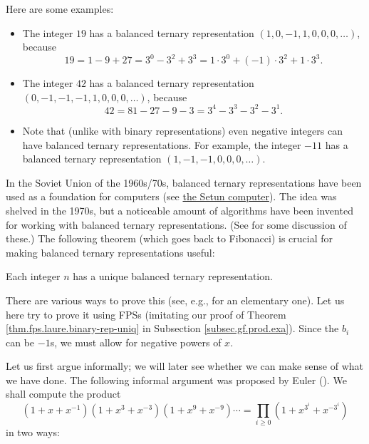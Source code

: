 Here are some examples:

\begin{itemize}
\item The integer $19$ has a balanced ternary representation $\left(
1,0,-1,1,0,0,0,\ldots\right)  $, because%
\[
19=1-9+27=3^{0}-3^{2}+3^{3}=1\cdot3^{0}+\left(  -1\right)  \cdot3^{2}%
+1\cdot3^{3}.
\]


\item The integer $42$ has a balanced ternary representation $\left(
0,-1,-1,-1,1,0,0,0,\ldots\right)  $, because%
\[
42=81-27-9-3=3^{4}-3^{3}-3^{2}-3^{1}.
\]


\item Note that (unlike with binary representations) even negative integers
can have balanced ternary representations. For example, the integer $-11$ has
a balanced ternary representation $\left(  1,-1,-1,0,0,0,\ldots\right)  $.
\end{itemize}

In the Soviet Union of the 1960s/70s, balanced ternary representations have
been used as a foundation for computers (see
\href{https://en.wikipedia.org/wiki/Setun}{the Setun computer}). The idea was
shelved in the 1970s, but a noticeable amount of algorithms have been invented
for working with balanced ternary representations. (See \cite[\S 4.1]%
{Knuth-TAoCP2} for some discussion of these.) The following theorem (which
goes back to Fibonacci) is crucial for making balanced ternary representations useful:

\begin{theorem}
\label{thm.fps.laure.balanced-tern-rep-uniq}Each integer $n$ has a unique
balanced ternary representation.
\end{theorem}

There are various ways to prove this (see, e.g., \cite[solution to Exercise
3.7.8]{20f} for an elementary one). Let us here try to prove it using FPSs
(imitating our proof of Theorem \ref{thm.fps.laure.binary-rep-uniq} in
Subsection \ref{subsec.gf.prod.exa}). Since the $b_{i}$ can be $-1$s, we must
allow for negative powers of $x$.

Let us first argue informally; we will later see whether we can make sense of
what we have done. The following informal argument was proposed by Euler
(\cite[\S 331]{Euler48}). We shall compute the product%
\[
\left(  1+x+x^{-1}\right)  \left(  1+x^{3}+x^{-3}\right)  \left(
1+x^{9}+x^{-9}\right)  \cdots=\prod_{i\geq0}\left(  1+x^{3^{i}}+x^{-3^{i}%
}\right)
\]
in two ways:

